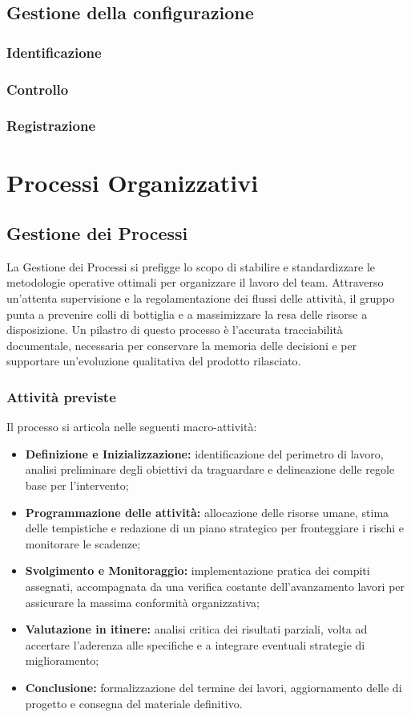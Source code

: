 \documentclass[documento]{gpt}
\begin{document}
	\subsection{Gestione della configurazione}
	\subsubsection{Identificazione}
	\subsubsection{Controllo}
	\subsubsection{Registrazione}
	
	\section{Processi Organizzativi}
	
	\subsection{Gestione dei Processi}
	La Gestione dei Processi si prefigge lo scopo di stabilire e standardizzare le metodologie operative ottimali per organizzare il lavoro del team. Attraverso un'attenta supervisione e la regolamentazione dei flussi delle attività, il gruppo punta a prevenire colli di bottiglia e a massimizzare la resa delle risorse a disposizione. Un pilastro di questo processo è l'accurata tracciabilità documentale, necessaria per conservare la memoria delle decisioni e per supportare un'evoluzione qualitativa del prodotto rilasciato.
	
	\subsubsection{Attività previste}
	Il processo si articola nelle seguenti macro-attività:
	\begin{itemize}
		\item \textbf{Definizione e Inizializzazione:} identificazione del perimetro di lavoro, analisi preliminare degli obiettivi da traguardare e delineazione delle regole base per l'intervento;
		\item \textbf{Programmazione delle attività:} allocazione delle risorse umane, stima delle tempistiche e redazione di un piano strategico per fronteggiare i rischi e monitorare le scadenze;
		\item \textbf{Svolgimento e Monitoraggio:} implementazione pratica dei compiti assegnati, accompagnata da una verifica costante dell'avanzamento lavori per assicurare la massima conformità organizzativa;
		\item \textbf{Valutazione in itinere:} analisi critica dei risultati parziali, volta ad accertare l'aderenza alle specifiche e a integrare eventuali strategie di miglioramento;
		\item \textbf{Conclusione:} formalizzazione del termine dei lavori, aggiornamento delle  di progetto e consegna del materiale definitivo.
	\end{itemize}
	
\end{document}
